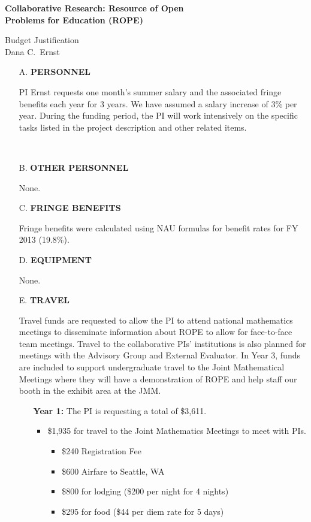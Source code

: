 \documentclass[11pt]{article}
\begin{document}
\begin{center}
{\Large \textbf{Collaborative Research: Resource of Open\\
Problems for Education (ROPE)}}

\bigskip

{\Large Budget Justification}\\
\smallskip
Dana C.~Ernst
\end{center}

\begin{enumerate}[leftmargin=*]

\item[A.] \textbf{PERSONNEL}

PI Ernst requests one month's summer salary and the associated fringe benefits each year for 3 years. We have assumed a salary increase of 3\% per year.  During the funding period, the PI will work intensively on the specific tasks listed in the project description and other related items. 

\ \hfill {}

\item[B.] \textbf{OTHER PERSONNEL}

None. \hfill {}

\item[C.] \textbf{FRINGE BENEFITS}

Fringe benefits were calculated using NAU formulas for benefit rates for FY 2013 (19.8\%).

\hfill {}

\item[D.] \textbf{EQUIPMENT}

None. \hfill {}

\item[E.] \textbf{TRAVEL}

Travel funds are requested to allow the PI to attend national mathematics meetings to disseminate information about ROPE to allow for face-to-face team meetings.  Travel to the collaborative PIs' institutions is also planned for meetings with the Advisory Group and External Evaluator. In Year 3, funds are included to support undergraduate travel to the Joint Mathematical Meetings where they will have a demonstration of ROPE and help staff our booth in the exhibit area at the JMM.

\begin{enumerate}
\item[] \textbf{Year 1:} The PI is requesting a total of \$3,611.
\begin{itemize}
\item \$1,935 for travel to the Joint Mathematics Meetings to meet with PIs.
\begin{itemize}
\item \$240 Registration Fee
\item \$600 Airfare to Seattle, WA
\item \$800 for lodging (\$200 per night for 4 nights)
\item \$295 for food (\$44 per diem rate for 5 days)
\end{itemize}


\end{itemize}
\end{enumerate}
\end{enumerate}
\end{document}
